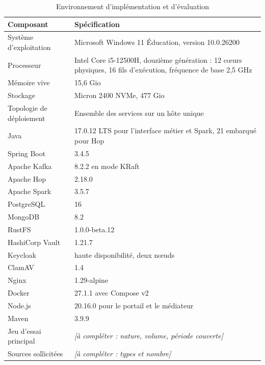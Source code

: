%



\begin{table}[htbp]
\centering
\caption{Environnement d'implémentation et d'évaluation}
\label{tab:env-materiel}
\small
\begin{tabularx}{\textwidth}{|p{4.4cm}|X|}
\hline
\textbf{Composant} & \textbf{Spécification} \\ \hline

Système d'exploitation & Microsoft Windows 11 Éducation, version 10.0.26200 \\ \hline
Processeur & Intel Core i5-12500H, douzième génération : 12 cœurs physiques,
16 fils d'exécution, fréquence de base 2,5 GHz \\ \hline
Mémoire vive & 15,6 Gio \\ \hline
Stockage & Micron 2400 NVMe, 477 Gio \\ \hline
Topologie de déploiement & Ensemble des services sur un hôte unique \\ \hline
Java & 17.0.12 LTS pour l'interface métier et Spark, 21 embarqué pour Hop \\ \hline
Spring Boot & 3.4.5 \\ \hline
Apache Kafka & 8.2.2 en mode KRaft \\ \hline
Apache Hop & 2.18.0 \\ \hline
Apache Spark & 3.5.7 \\ \hline
PostgreSQL & 16 \\ \hline
MongoDB & 8.2 \\ \hline
RustFS & 1.0.0-beta.12 \\ \hline
HashiCorp Vault & 1.21.7 \\ \hline
Keycloak & haute disponibilité, deux nœuds \\ \hline
ClamAV & 1.4 \\ \hline
Nginx & 1.29-alpine \\ \hline
Docker & 27.1.1 avec Compose v2 \\ \hline
Node.js & 20.16.0 pour le portail et le médiateur \\ \hline
Maven & 3.9.9 \\ \hline
Jeu d'essai principal & \emph{[à compléter : nature, volume, période couverte]} \\ \hline
Sources sollicitées & \emph{[à compléter : types et nombre]} \\ \hline

\end{tabularx}
\end{table}

